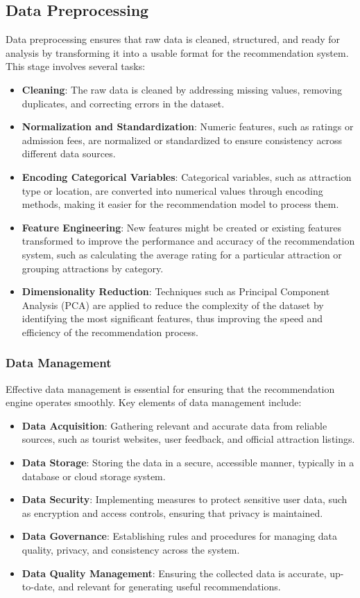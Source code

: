 \subsection{Data Preprocessing}
Data preprocessing ensures that raw data is cleaned, structured, and ready for analysis by transforming it into a usable format for the recommendation system. This stage involves several tasks:
\begin{itemize}
    \item \textbf{Cleaning}: The raw data is cleaned by addressing missing values, removing duplicates, and correcting errors in the dataset.
    \item \textbf{Normalization and Standardization}: Numeric features, such as ratings or admission fees, are normalized or standardized to ensure consistency across different data sources.
    \item \textbf{Encoding Categorical Variables}: Categorical variables, such as attraction type or location, are converted into numerical values through encoding methods, making it easier for the recommendation model to process them.
    \item \textbf{Feature Engineering}: New features might be created or existing features transformed to improve the performance and accuracy of the recommendation system, such as calculating the average rating for a particular attraction or grouping attractions by category.
    \item \textbf{Dimensionality Reduction}: Techniques such as Principal Component Analysis (PCA) are applied to reduce the complexity of the dataset by identifying the most significant features, thus improving the speed and efficiency of the recommendation process.
\end{itemize}

\subsubsection{Data Management}
Effective data management is essential for ensuring that the recommendation engine operates smoothly. Key elements of data management include:
\begin{itemize}
    \item \textbf{Data Acquisition}: Gathering relevant and accurate data from reliable sources, such as tourist websites, user feedback, and official attraction listings.
    \item \textbf{Data Storage}: Storing the data in a secure, accessible manner, typically in a database or cloud storage system.
    \item \textbf{Data Security}: Implementing measures to protect sensitive user data, such as encryption and access controls, ensuring that privacy is maintained.
    \item \textbf{Data Governance}: Establishing rules and procedures for managing data quality, privacy, and consistency across the system.
    \item \textbf{Data Quality Management}: Ensuring the collected data is accurate, up-to-date, and relevant for generating useful recommendations.
\end{itemize}

